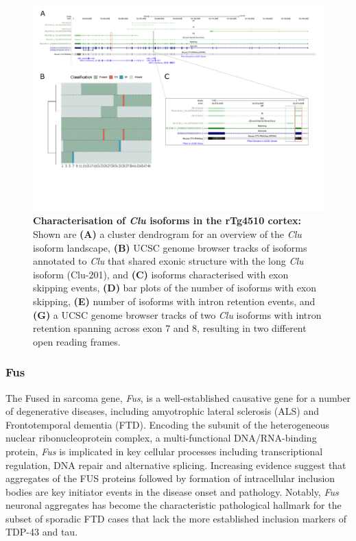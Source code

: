 \begin{landscape}
	\begin{figure}[htp]
		\centering
		\captionsetup{width=1.3\textwidth}
		\includegraphics[page=6,trim={0 1.5cm 0 0},scale = 0.85]{Figures/TargetGenes_Annotation_Landscape.pdf}
		\caption[Characterisation of \textit{Clu} isoforms in the rTg4510 cortex]%
		{\textbf{Characterisation of \textit{Clu} isoforms in the rTg4510 cortex:} Shown are \textbf{(A)} a cluster dendrogram for an overview of the \textit{Clu} isoform landscape, \textbf{(B)} UCSC genome browser tracks of isoforms annotated to \textit{Clu} that shared exonic structure with the long \textit{Clu} isoform (Clu-201), and \textbf{(C)} isoforms characterised with exon skipping events, \textbf{(D)} bar plots of the number of isoforms with exon skipping, \textbf{(E)} number of isoforms with intron retention events, and \textbf{(G)} a UCSC genome browser tracks of two \textit{Clu} isoforms with intron retention spanning across exon 7 and 8, resulting in two different open reading frames.}    
		\label{fig:clu}
	\end{figure}
\end{landscape}
\restoregeometry



\newpage
\subsubsection{Fus}
The Fused in sarcoma gene, \textit{Fus}, is a well-established causative gene for a number of degenerative diseases, including amyotrophic lateral sclerosis (ALS) and Frontotemporal dementia (FTD). Encoding the subunit of the heterogeneous nuclear ribonucleoprotein complex, a multi-functional DNA/RNA-binding protein,  \textit{Fus} is implicated in key cellular processes including transcriptional regulation, DNA repair and alternative splicing\cite{Shelkovnikova2014}. Increasing evidence suggest that aggregates of the FUS proteins followed by formation of intracellular inclusion bodies are key initiator events in the disease onset and pathology\cite{Shelkovnikova2014}. Notably, \textit{Fus} neuronal aggregates has become the characteristic pathological hallmark for the subset of sporadic FTD cases that lack the more established inclusion markers of TDP-43 and tau\cite{Seelaar2010}.

